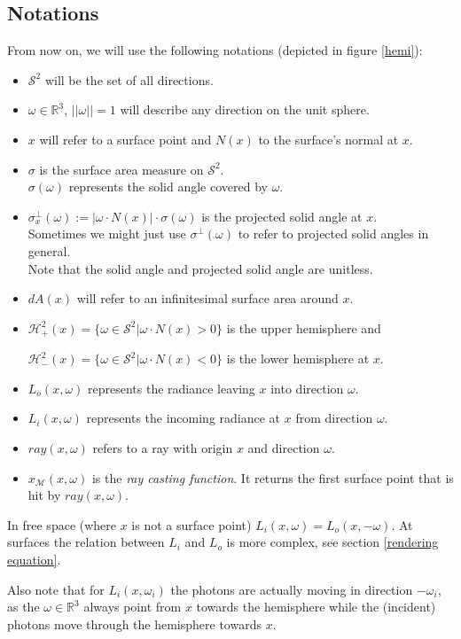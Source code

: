 \newpage
\subsection{Notations}
From now on, we will use the following notations (depicted in figure \ref{hemi}):
\begin{itemize}
\item $\mathcal{S}^2$ will be the set of all directions.
\item $\omega \in \mathbb{R}^3$, $||\omega|| = 1$ will describe any direction on the unit sphere.
\item $x$ will refer to a surface point and $N(x)$ to the surface's normal at $x$.
\item $\sigma$ is the surface area measure on $\mathcal{S}^2$.\\
$\sigma(\omega)$ represents the solid angle covered by $\omega$.
\item $\sigma^\bot_x(\omega) := |\omega \cdot N(x)| \cdot \sigma(\omega)$ is the projected solid angle at $x$.\\
Sometimes we might just use $\sigma^\bot(\omega)$ to refer to projected solid angles in general.\\
Note that the solid angle and projected solid angle are unitless.
\item $dA(x)$ will refer to an infinitesimal surface area around $x$.
\item $\mathcal{H}_+^2(x) = \{\omega\in\mathcal{S}^2 | \omega \cdot N(x) > 0\}$ is the upper hemisphere and

$\mathcal{H}_-^2(x) = \{\omega \in\mathcal{S}^2 | \omega \cdot N(x) < 0\}$ is the lower hemisphere at $x$.
\item $L_o(x,\omega)$ represents the radiance leaving $x$ into direction $\omega$.
\item $L_i(x,\omega)$ represents the incoming radiance at $x$ from direction $\omega$.
\item $ray(x,\omega)$ refers to a ray with origin $x$ and direction $\omega$.
\item $x_\mathcal{M}(x,\omega)$ is the \emph{ray casting function}. It returns the first surface point that is hit by $ray(x,\omega)$.


\end{itemize}
In free space (where $x$ is not a surface point) $L_i(x,\omega) = L_o(x,-\omega)$. At surfaces the relation between $L_i$ and $L_o$ is more complex, see section \ref{rendering equation}.

Also note that for $L_i(x,\omega_i)$ the photons are actually moving in direction $-\omega_i$, as the $\omega \in \mathbb{R}^3$ always point from $x$ towards the hemisphere while the (incident) photons move through the hemisphere towards $x$.


